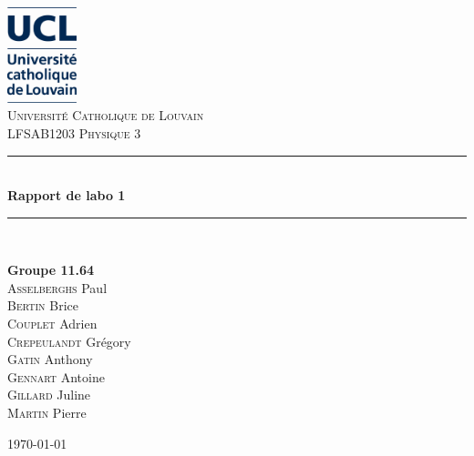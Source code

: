 \documentclass[a4paper,11pt]{article}
\begin{document}

\newcommand{\HRule}{\rule{\linewidth}{0.5mm}}

\fancyhf{} %
\fancyhead[R]{\thepage} %


\pagestyle{fancy}
\thispagestyle{empty}
\begin{titlepage}
\begin{center}

\includegraphics[width=0.15\textwidth]{images/logo.JPG}~\\[1cm]

\textsc{\LARGE Université Catholique de Louvain}\\[1.5cm]

\textsc{\Large LFSAB1203 Physique 3}\\[0.5cm]

\HRule \\[0.4cm]
{ \huge \bfseries Rapport de labo 1\\[0.4cm] }

\HRule \\[1.5cm]

\begin{minipage}{0.4\textwidth}
\begin{flushleft} \large
\textbf{Groupe \textsc{11.64}} \\
\textsc{Asselberghs} Paul \\
\textsc{Bertin} Brice \\
\textsc{Couplet} Adrien \\
\textsc{Crepeulandt} Grégory \\
\textsc{Gatin} Anthony \\
\textsc{Gennart} Antoine \\
\textsc{Gillard} Juline \\
\textsc{Martin} Pierre


\end{flushleft}
\end{minipage}
\begin{minipage}{0.4\textwidth}
\begin{flushright} \large
\end{flushright}
\end{minipage}

\setcounter{tocdepth}{2}
\tableofcontents %

\vfill

{\large \today}
\end{center}
\end{titlepage}
\end{document}
